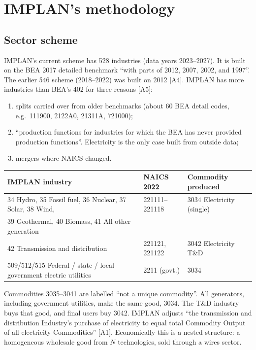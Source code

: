 \documentclass[11pt]{article}
\begin{document}
\section{IMPLAN's methodology}\label{sec:implan}

\subsection{Sector scheme}
IMPLAN's current scheme has 528 industries (data years 2023--2027). It is built on the BEA 2017 detailed benchmark ``with parts of 2012, 2007, 2002, and 1997''. The earlier 546 scheme (2018--2022) was built on 2012 [A4]. IMPLAN has more industries than BEA's 402 for three reasons [A5]:
\begin{enumerate}
  \item splits carried over from older benchmarks (about 60 BEA detail codes, e.g.\ 111900, 2122A0, 21311A, 721000);
  \item ``production functions for industries for which the BEA has never provided production functions''. Electricity is the only case built from outside data;
  \item mergers where NAICS changed.
\end{enumerate}

\begin{center}\small
\begin{tabular}{lll}
\toprule
IMPLAN industry & NAICS 2022 & Commodity produced \\
\midrule
34 Hydro, 35 Fossil fuel, 36 Nuclear, 37 Solar, 38 Wind, & 221111--221118 & 3034 Electricity (single) \\
39 Geothermal, 40 Biomass, 41 All other generation & & \\
42 Transmission and distribution & 221121, 221122 & 3042 Electricity T\&D \\
509/512/515 Federal / state / local government electric utilities & 2211 (govt.) & 3034 \\
\bottomrule
\end{tabular}
\end{center}
Commodities 3035--3041 are labelled ``not a unique commodity''. All generators, including government utilities, make the same good, 3034. The T\&D industry buys that good, and final users buy 3042. IMPLAN adjusts ``the transmission and distribution Industry's purchase of electricity to equal total Commodity Output of all electricity Commodities'' [A1]. Economically this is a nested structure: a homogeneous wholesale good from $N$ technologies, sold through a wires sector.
\end{document}
